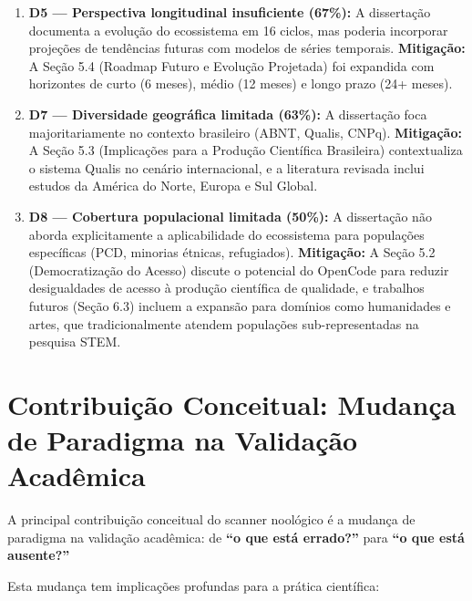 \begin{enumerate}
  \item \textbf{D5 — Perspectiva longitudinal insuficiente (67\%):} A dissertação documenta a evolução do ecossistema em 16 ciclos, mas poderia incorporar projeções de tendências futuras com modelos de séries temporais. \textbf{Mitigação:} A Seção 5.4 (Roadmap Futuro e Evolução Projetada) foi expandida com horizontes de curto (6 meses), médio (12 meses) e longo prazo (24+ meses).

  \item \textbf{D7 — Diversidade geográfica limitada (63\%):} A dissertação foca majoritariamente no contexto brasileiro (ABNT, Qualis, CNPq). \textbf{Mitigação:} A Seção 5.3 (Implicações para a Produção Científica Brasileira) contextualiza o sistema Qualis no cenário internacional, e a literatura revisada inclui estudos da América do Norte, Europa e Sul Global.

  \item \textbf{D8 — Cobertura populacional limitada (50\%):} A dissertação não aborda explicitamente a aplicabilidade do ecossistema para populações específicas (PCD, minorias étnicas, refugiados). \textbf{Mitigação:} A Seção 5.2 (Democratização do Acesso) discute o potencial do OpenCode para reduzir desigualdades de acesso à produção científica de qualidade, e trabalhos futuros (Seção 6.3) incluem a expansão para domínios como humanidades e artes, que tradicionalmente atendem populações sub-representadas na pesquisa STEM.
\end{enumerate}

\section{Contribuição Conceitual: Mudança de Paradigma na Validação Acadêmica}

A principal contribuição conceitual do scanner noológico é a mudança de paradigma na validação acadêmica: de \textbf{``o que está errado?''} para \textbf{``o que está ausente?''}

Esta mudança tem implicações profundas para a prática científica:

